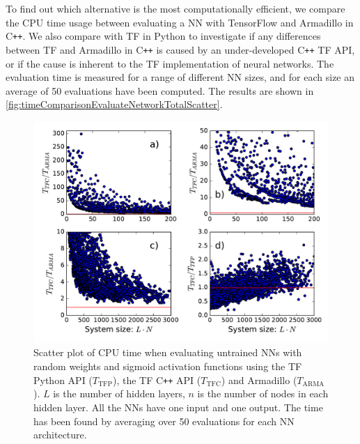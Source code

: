 \documentclass[twoside,english]{uiofysmaster}
\begin{document}
To find out which alternative is the most computationally efficient, we compare the 
CPU time usage between evaluating a NN with TensorFlow and Armadillo in C\texttt{++}. We also compare with TF in Python to 
investigate if any differences between TF and Armadillo in C\texttt{++} is caused by an under-developed C\texttt{++} TF API, or 
if the cause is inherent to the TF implementation of neural networks.
The evaluation time 
is measured for a range of different NN sizes, and for each size an average of 50 evaluations have been computed.
The results are shown in \autoref{fig:timeComparisonEvaluateNetworkTotalScatter}.
\begin{figure}
\centering
  \includegraphics[width = 0.9\linewidth]{Figures/Tests/timeComparisonNetworkNew.pdf}
  \caption{Scatter plot of CPU time when evaluating untrained NNs with random weights and sigmoid activation functions
	   using the TF Python API ($T_{\mathrm{TFP}}$), the TF C\texttt{++} API ($T_{\mathrm{TFC}}$) and Armadillo ($T_{\mathrm{ARMA}}$). 
	   $L$ is the number of hidden layers, $n$ is the number of nodes in each hidden layer. All the NNs
	   have one input and one output. The time has been found by averaging over 50 evaluations
	   for each NN architecture.}
\label{fig:timeComparisonEvaluateNetworkTotalScatter}
\end{figure}
\end{document}

